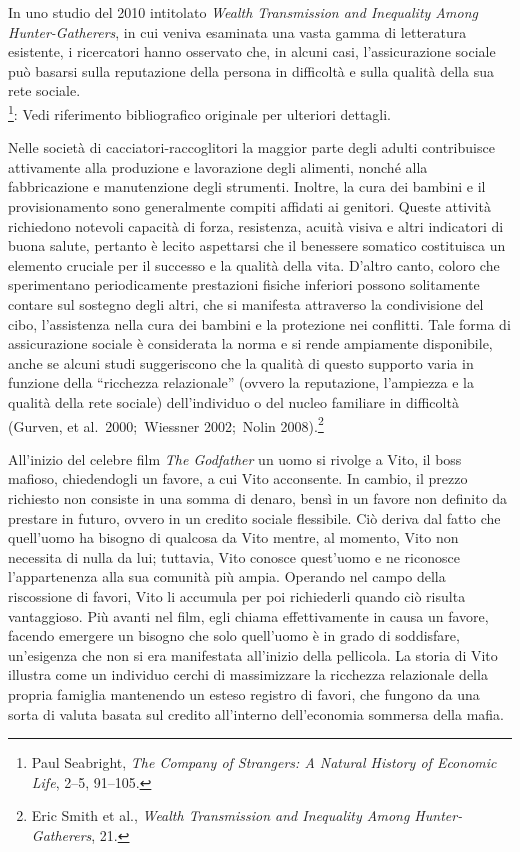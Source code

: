 \documentclass[
  a5paper,
  smalldemyvopaper,10pt,twoside,onecolumn,openright,extrafontsizes,hidelinks]{memoir}
\begin{document}
In uno studio del 2010 intitolato \emph{Wealth Transmission and
Inequality Among Hunter-Gatherers}, in cui veniva esaminata una vasta
gamma di letteratura esistente, i ricercatori hanno osservato che, in
alcuni casi, l'assicurazione sociale può basarsi sulla reputazione della
persona in difficoltà e sulla qualità della sua rete sociale.\\
\footnote{Paul Seabright, \emph{The Company of Strangers: A Natural
  History of Economic Life}, 2--5, 91--105.}: Vedi riferimento
bibliografico originale per ulteriori dettagli.

Nelle società di cacciatori-raccoglitori la maggior parte degli adulti
contribuisce attivamente alla produzione e lavorazione degli alimenti,
nonché alla fabbricazione e manutenzione degli strumenti. Inoltre, la
cura dei bambini e il provisionamento sono generalmente compiti affidati
ai genitori. Queste attività richiedono notevoli capacità di forza,
resistenza, acuità visiva e altri indicatori di buona salute, pertanto è
lecito aspettarsi che il benessere somatico costituisca un elemento
cruciale per il successo e la qualità della vita. D'altro canto, coloro
che sperimentano periodicamente prestazioni fisiche inferiori possono
solitamente contare sul sostegno degli altri, che si manifesta
attraverso la condivisione del cibo, l'assistenza nella cura dei bambini
e la protezione nei conflitti. Tale forma di assicurazione sociale è
considerata la norma e si rende ampiamente disponibile, anche se alcuni
studi suggeriscono che la qualità di questo supporto varia in funzione
della ``ricchezza relazionale'' (ovvero la reputazione, l'ampiezza e la
qualità della rete sociale) dell'individuo o del nucleo familiare in
difficoltà (Gurven, et al.~2000;~Wiessner 2002;~Nolin 2008).\footnote{Eric
  Smith et al., \emph{Wealth Transmission and Inequality Among
  Hunter-Gatherers}, 21.}

All'inizio del celebre film \emph{The Godfather} un uomo si rivolge a
Vito, il boss mafioso, chiedendogli un favore, a cui Vito acconsente. In
cambio, il prezzo richiesto non consiste in una somma di denaro, bensì
in un favore non definito da prestare in futuro, ovvero in un credito
sociale flessibile. Ciò deriva dal fatto che quell'uomo ha bisogno di
qualcosa da Vito mentre, al momento, Vito non necessita di nulla da lui;
tuttavia, Vito conosce quest'uomo e ne riconosce l'appartenenza alla sua
comunità più ampia. Operando nel campo della riscossione di favori, Vito
li accumula per poi richiederli quando ciò risulta vantaggioso. Più
avanti nel film, egli chiama effettivamente in causa un favore, facendo
emergere un bisogno che solo quell'uomo è in grado di soddisfare,
un'esigenza che non si era manifestata all'inizio della pellicola. La
storia di Vito illustra come un individuo cerchi di massimizzare la
ricchezza relazionale della propria famiglia mantenendo un esteso
registro di favori, che fungono da una sorta di valuta basata sul
credito all'interno dell'economia sommersa della mafia.
\end{document}
